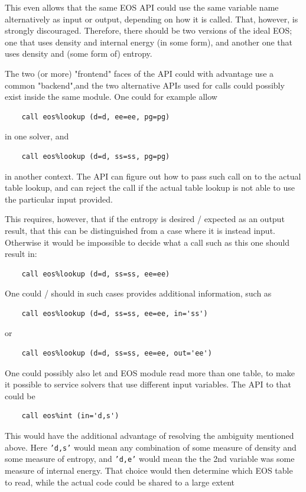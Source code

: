 \documentclass[paper=a4,fontsize=11pt]{scrartcl}
\numberwithin{equation}{section}		%
\numberwithin{figure}{section}			%
\numberwithin{table}{section}				%
\newcommand{\codecolor}{\color{Blue}}
\newcommand{\Code}[1]{{\codecolor\texttt{#1}}}
\begin{document}
This even allows that the same EOS API could use the same variable name alternatively as input or output, depending on how it is called.  That, however, is strongly discouraged.   Therefore, there should be two versions of the ideal EOS; one that uses density and internal energy (in some form), and another one that uses density and (some form of) entropy.

The two (or more) "frontend" faces of the API could with advantage use a common "backend",and the two alternative APIs used for calls could possibly exist inside the same module.  One could for example allow
{\codecolor\begin{verbatim}
    call eos%lookup (d=d, ee=ee, pg=pg)
\end{verbatim}}
in one solver, and
{\codecolor\begin{verbatim}
    call eos%lookup (d=d, ss=ss, pg=pg)
\end{verbatim}}
in another context.  The API can figure out how to pass such call on to the actual table lookup, and can reject the call if the actual table lookup is not able to use the particular input provided.

This requires, however, that if the entropy is desired / expected as an output result, that this can be distinguished from a case where it is instead input.  Otherwise it would be impossible to decide what a call such as this one should result in:
{\codecolor\begin{verbatim}
    call eos%lookup (d=d, ss=ss, ee=ee)
\end{verbatim}}
One could / should in such cases provides additional information, such as
{\codecolor\begin{verbatim}
    call eos%lookup (d=d, ss=ss, ee=ee, in='ss')
\end{verbatim}}
or
{\codecolor\begin{verbatim}
    call eos%lookup (d=d, ss=ss, ee=ee, out='ee')
\end{verbatim}}

One could possibly also let and EOS module read more than one table, to make it possible to service solvers that use different input variables.   The API to that could be
{\codecolor\begin{verbatim}
    call eos%int (in='d,s')
\end{verbatim}}
This would have the additional advantage of resolving the ambiguity mentioned above.  Here \Code{'d,s'} would mean any combination of some measure of density and some measure of entropy, and \Code{'d,e'} would mean the the 2nd variable was some measure of internal energy.  That choice would then determine which EOS table to read, while the actual code could be shared to a large extent
\end{document}
